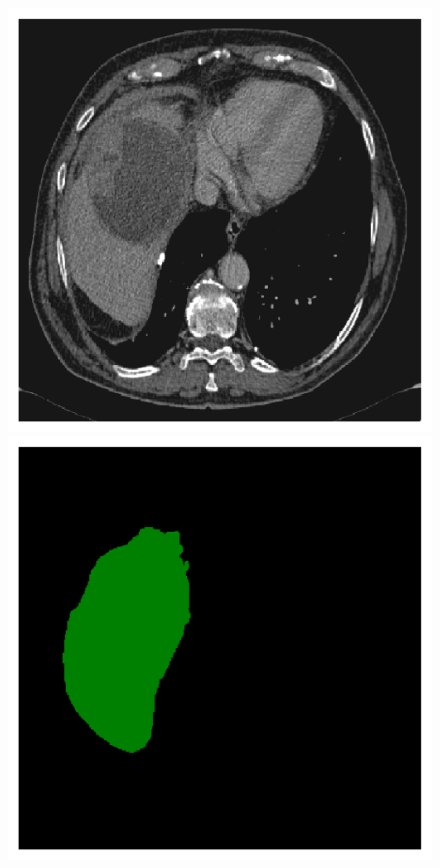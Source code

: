 {\begin{figure}[!ht]
\begin{mdframed}[backgroundcolor=blue!50,linecolor=blue!50]
\begin{minipage}{4cm}
	\end{minipage} \\
	\begin{minipage}{4cm}
		\includegraphics[width=\linewidth]{images/LiverVE_Raw_Pat1_1}
	\end{minipage} \hspace{-0.3cm}
	\begin{minipage}{4cm}
		\includegraphics[width=\linewidth]{images/LiverVE_GT_Pat1_1}

\end{minipage}
\end{mdframed}
\end{figure}}
